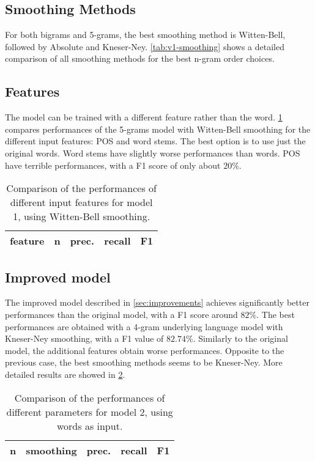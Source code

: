\subsection{Smoothing Methods}
For both bigrams and 5-grams, the best smoothing method is Witten-Bell, followed by Absolute and Kneser-Ney.
\cref{tab:v1-smoothing} shows a detailed comparison of all smoothing methods for the best n-gram order choices.

\subsection{Features}
The model can be trained with a different feature rather than the word.
\cref{tab:v1-features} compares performances of the 5-grams model with Witten-Bell smoothing for the different input features: \ac{POS} and word stems.
The best option is to use just the original words.
Word stems have slightly worse performances than words.
\ac{POS} have terrible performances, with a F1 score of only about $20\%$.

\begin{table}
	\centering
    \begin{tabular}{ l l l l l }
    	\toprule
    		feature & n & prec. & recall & F1 \\
    	\midrule
            
    	\bottomrule
	\end{tabular}
    \caption{Comparison of the performances of different input features for model 1, using Witten-Bell smoothing.}
	\label{tab:v1-features}
\end{table}

\subsection{Improved model}
The improved model described in \cref{sec:improvements} achieves significantly better performances than the original model, with a F1 score around $82\%$.
The best performances are obtained with a 4-gram underlying language model with Kneser-Ney smoothing, with a F1 value of $82.74\%$.
Similarly to the original model, the additional features obtain worse performances.
Opposite to the previous case, the best smoothing methods seems to be Kneser-Ney.
More detailed results are showed in \cref{tab:v2}.

\begin{table}
	\centering
    \begin{tabular}{ l l l l l }
    	\toprule
    		n & smoothing & prec. & recall & F1 \\
    	\midrule
            
    	\bottomrule
	\end{tabular}
    \caption{Comparison of the performances of different parameters for model 2, using words as input.}
	\label{tab:v2}
\end{table}
